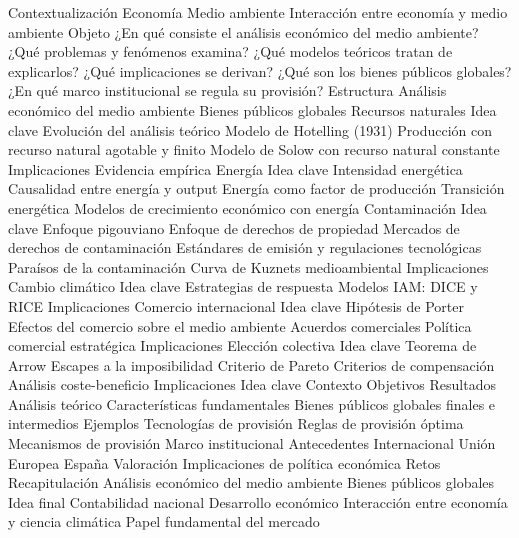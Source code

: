 \documentclass{nuevotema}
\begin{document}
\begin{esquema}[enumerate]
	\1[] 
		\2 Contextualización
			\3 Economía
			\3 Medio ambiente
			\3 Interacción entre economía y medio ambiente
		\2 Objeto
			\3 ¿En qué consiste el análisis económico del medio ambiente?
			\3 ¿Qué problemas y fenómenos examina?
			\3 ¿Qué modelos teóricos tratan de explicarlos?
			\3 ¿Qué implicaciones se derivan?
			\3 ¿Qué son los bienes públicos globales?
			\3 ¿En qué marco institucional se regula su provisión?
		\2 Estructura
			\3 Análisis económico del medio ambiente
			\3 Bienes públicos globales
	\1 
		\2 Recursos naturales
			\3 Idea clave
			\3 Evolución del análisis teórico
			\3 Modelo de Hotelling (1931)
			\3 Producción con recurso natural agotable y  finito
			\3 Modelo de Solow con recurso natural constante
			\3 Implicaciones
			\3 Evidencia empírica
		\2 Energía
			\3 Idea clave
			\3 Intensidad energética
			\3 Causalidad entre energía y output
			\3 Energía como factor de producción
			\3 Transición energética
			\3 Modelos de crecimiento económico con energía
		\2 Contaminación
			\3 Idea clave
			\3 Enfoque pigouviano
			\3 Enfoque de derechos de propiedad
			\3 Mercados de derechos de contaminación
			\3 Estándares de emisión y regulaciones tecnológicas
			\3 Paraísos de la contaminación
			\3 Curva de Kuznets medioambiental
			\3 Implicaciones
		\2 Cambio climático
			\3 Idea clave
			\3 Estrategias de respuesta
			\3 Modelos IAM: DICE y RICE
			\3 Implicaciones
		\2 Comercio internacional
			\3 Idea clave
			\3 Hipótesis de Porter
			\3 Efectos del comercio sobre el medio ambiente
			\3 Acuerdos comerciales
			\3 Política comercial estratégica
			\3 Implicaciones
		\2 Elección colectiva
			\3 Idea clave
			\3 Teorema de Arrow
			\3 Escapes a la imposibilidad
			\3 Criterio de Pareto
			\3 Criterios de compensación
			\3 Análisis coste-beneficio
			\3 Implicaciones
	\1 
		\2 Idea clave
			\3 Contexto
			\3 Objetivos
			\3 Resultados
		\2 Análisis teórico
			\3 Características fundamentales
			\3 Bienes públicos globales finales e intermedios
			\3 Ejemplos
			\3 Tecnologías de provisión
			\3 Reglas de provisión óptima
			\3 Mecanismos de provisión
		\2 Marco institucional
			\3 Antecedentes
			\3 Internacional
			\3 Unión Europea
			\3 España
		\2 Valoración
			\3 Implicaciones de política económica
			\3 Retos
	\1[] 
		\2 Recapitulación
			\3 Análisis económico del medio ambiente
			\3 Bienes públicos globales
		\2 Idea final
			\3 Contabilidad nacional
			\3 Desarrollo económico
			\3 Interacción entre economía y ciencia climática
			\3 Papel fundamental del mercado

\end{esquema}
\end{document}
